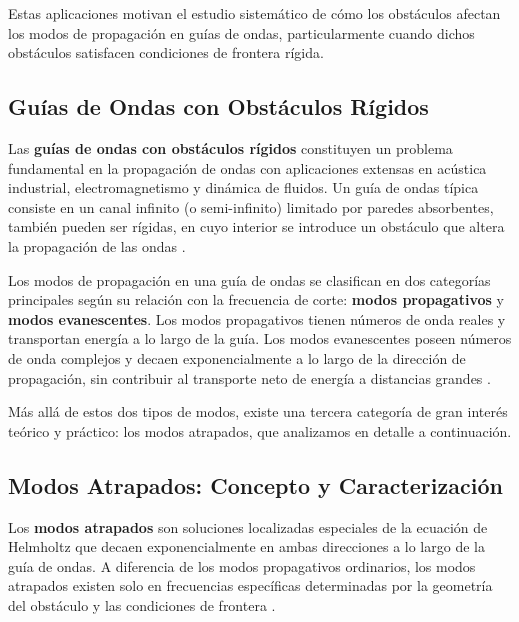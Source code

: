 \documentclass[11pt]{article}
\begin{document}
Estas aplicaciones motivan el estudio sistemático de cómo los obstáculos afectan los modos de propagación en guías de ondas, particularmente cuando dichos obstáculos satisfacen condiciones de frontera rígida.

\subsection{Guías de Ondas con Obstáculos Rígidos}\label{subsec:obstaculos_rigidos}

Las \textbf{guías de ondas con obstáculos rígidos} constituyen un problema fundamental en la propagación de ondas con aplicaciones extensas en acústica industrial, electromagnetismo y dinámica de fluidos. Un guía de ondas típica consiste en un canal infinito (o semi-infinito) limitado por paredes absorbentes, también pueden ser rígidas, en cuyo interior se introduce un obstáculo que altera la propagación de las ondas \cite{Linton2008, Pagneux2007, Khallaf2000}.

Los modos de propagación en una guía de ondas se clasifican en dos categorías principales según su relación con la frecuencia de corte: \textbf{modos propagativos} y \textbf{modos evanescentes}. Los modos propagativos tienen números de onda reales y transportan energía a lo largo de la guía. Los modos evanescentes poseen números de onda complejos y decaen exponencialmente a lo largo de la dirección de propagación, sin contribuir al transporte neto de energía a distancias grandes \cite{Pagneux2007}.

Más allá de estos dos tipos de modos, existe una tercera categoría de gran interés teórico y práctico: los modos atrapados, que analizamos en detalle a continuación.

\subsection{Modos Atrapados: Concepto y Caracterización}\label{subsec:trapped_modes}

Los \textbf{modos atrapados} son soluciones localizadas especiales de la ecuación de Helmholtz que decaen exponencialmente en ambas direcciones a lo largo de la guía de ondas. A diferencia de los modos propagativos ordinarios, los modos atrapados existen solo en frecuencias específicas determinadas por la geometría del obstáculo y las condiciones de frontera \cite{Zhevandrov2025, Khallaf2000}.
\end{document}
